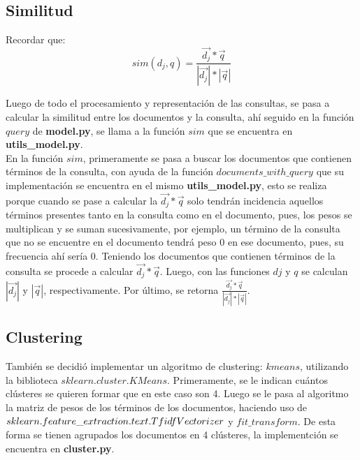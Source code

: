 \documentclass{llncs}
\begin{document}
\subsection{Similitud}
Recordar que:\\

\begin{equation}
	sim(d_j,q) = \frac{\overrightarrow{d_j}*\overrightarrow{q}}{|\overrightarrow{d_j}|*|\overrightarrow{q}|}
\end{equation}

Luego de todo el procesamiento y representaci\'on de las consultas, se pasa a calcular la similitud entre los documentos y la consulta, ah\'i seguido en la funci\'on $query$ de \textbf{model.py}, se llama a la funci\'on $sim$ que se encuentra en \textbf{utils\_model.py}.\\

En la funci\'on $sim$, primeramente se pasa a buscar los documentos que contienen t\'erminos de la consulta, con ayuda de la funci\'on $documents\_with\_query$ que su implementaci\'on se encuentra en el mismo \textbf{utils\_model.py}, esto se realiza porque cuando se pase a calcular la $\overrightarrow{d_j}*\overrightarrow{q}$ solo tendr\'an incidencia aquellos t\'erminos presentes tanto en la consulta como en el documento, pues, los pesos se multiplican y se suman sucesivamente, por ejemplo, un t\'ermino de la consulta que no se encuentre en el documento tendr\'a peso 0 en ese documento, pues, su frecuencia ah\'i ser\'ia 0. Teniendo los documentos que contienen t\'erminos de la consulta se procede a calcular $\overrightarrow{d_j}*\overrightarrow{q}$. Luego, con las funciones $dj$ y $q$ se calculan $|\overrightarrow{d_j}|$ y $|\overrightarrow{q}|$, respectivamente. Por \'ultimo, se retorna $\frac{\overrightarrow{d_j}*\overrightarrow{q}}{|\overrightarrow{d_j}|*|\overrightarrow{q}|}$.\\

\subsection{Clustering}
Tambi\'en se decidi\'o implementar un algoritmo de clustering: $kmeans$, utilizando la biblioteca $sklearn.cluster.KMeans$. Primeramente, se le indican cu\'antos cl\'usteres se quieren formar que en este caso son 4. Luego se le pasa al algoritmo la matriz de pesos de los t\'erminos de los documentos, haciendo uso de $sklearn.feature\_extraction. \\ text.TfidfVectorizer$ y $fit\_transform$. De esta forma se tienen agrupados los documentos en 4 cl\'usteres, la implementci\'on se encuentra en \textbf{cluster.py}.\\
\end{document}
